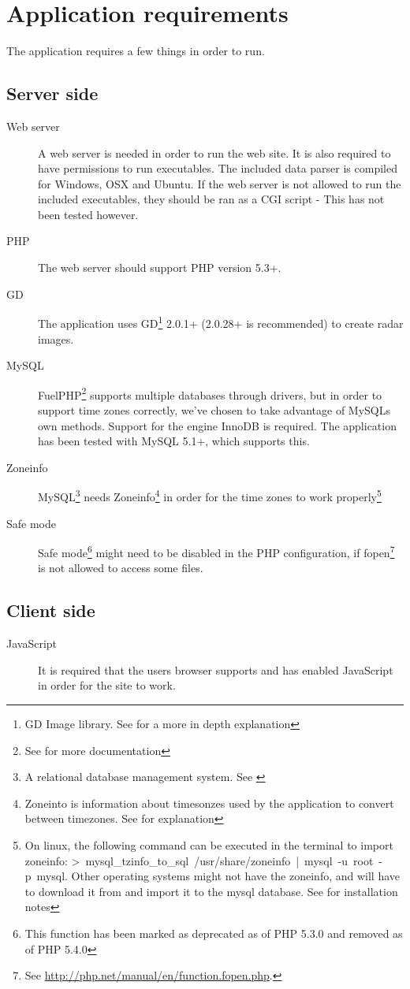 \chapter{Application requirements}
\label{sec:application_requirements}
The application requires a few things in order to run.

\section{Server side}
\label{sec:server_side}
\begin{description}
\item[Web server] A web server is needed in order to run the web site. It is also required to have permissions to run executables. The included data parser is compiled for Windows, OSX and Ubuntu. If the web server is not allowed to run the included executables, they should be ran as a CGI script - This has not been tested however.
\item[PHP] The web server should support PHP version 5.3+.
\item[GD] The application uses GD\footnote{GD Image library. See \cite{GD} for a more in depth explanation} 2.0.1+ (2.0.28+ is recommended) to create radar images.
\item[MySQL] FuelPHP\footnote{See \cite{FuelPHP} for more documentation} supports multiple databases through drivers, but in order to support time zones correctly, we've chosen to take advantage of MySQLs own methods. Support for the engine \textsf{InnoDB} is required. The application has been tested with MySQL 5.1+, which supports this.
\item[Zoneinfo] MySQL\footnote{A relational database management system. See \cite{MySQL}} needs Zoneinfo\footnote{Zoneinto is information about timesonzes used by the application to convert between timezones. See \cite{Zoneinfo} for explanation} in order for the time zones to work properly\footnote{On linux, the following command can be executed in the terminal to import zoneinfo: \mbox{\textsf{> mysql\_tzinfo\_to\_sql /usr/share/zoneinfo | mysql -u root -p mysql}}. Other operating systems might not have the zoneinfo, and will have to download it from \cite{Zoneinfo_download} and import it to the mysql database. See \cite{Zoneinfo_install} for installation notes}
\item[Safe mode] Safe mode\footnote{This function has been marked as deprecated as of PHP 5.3.0 and removed as of PHP 5.4.0} might need to be disabled in the PHP configuration, if \textsf{fopen}\footnote{See \url{http://php.net/manual/en/function.fopen.php}.} is not allowed to access some files.
\end{description}

\section{Client side}
\label{sec:client_side}
\begin{description}
\item[JavaScript] It is required that the users browser supports and has enabled JavaScript in order for the site to work.
\end{description}
